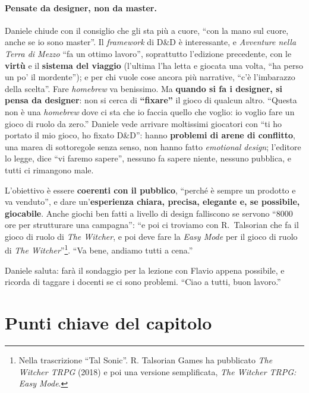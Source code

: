 \paragraph{Pensate da designer, non da master.} Daniele chiude con il consiglio che gli sta più a cuore,
``con la mano sul cuore, anche se io sono master''. Il \emph{framework} di D\&D è interessante, e
\emph{Avventure nella Terra di Mezzo} ``fa un ottimo lavoro'', soprattutto l'edizione precedente, con le
\textbf{virtù} e il \textbf{sistema del viaggio} (l'ultima l'ha letta e giocata una volta, ``ha perso un
po' il mordente''); e per chi vuole cose ancora più narrative, ``c'è l'imbarazzo della scelta''. Fare
\emph{homebrew} va benissimo. Ma \textbf{quando si fa i designer, si pensa da designer}: non si cerca di
\textbf{``fixare''} il gioco di qualcun altro. ``Questa non è una \emph{homebrew} dove ci sta che io
faccia quello che voglio: io voglio fare un gioco di ruolo da zero.'' Daniele vede arrivare moltissimi
giocatori con ``ti ho portato il mio gioco, ho fixato D\&D'': hanno \textbf{problemi di arene di
conflitto}, una marea di sottoregole senza senso, non hanno fatto \emph{emotional design}; l'editore lo
legge, dice ``vi faremo sapere'', nessuno fa sapere niente, nessuno pubblica, e tutti ci rimangono male.

L'obiettivo è essere \textbf{coerenti con il pubblico}, ``perché è sempre un prodotto e va venduto'', e
dare un'\textbf{esperienza chiara, precisa, elegante e, se possibile, giocabile}. Anche giochi ben fatti
a livello di design falliscono se servono ``8000 ore per strutturare una campagna'': ``e poi ci troviamo
con R.~Talsorian che fa il gioco di ruolo di \emph{The Witcher}, e poi deve fare la \emph{Easy Mode} per
il gioco di ruolo di \emph{The Witcher}''\footnote{Nella trascrizione ``Tal Sonic''. R. Talsorian Games
ha pubblicato \emph{The Witcher TRPG} (2018) e poi una versione semplificata, \emph{The Witcher TRPG:
Easy Mode}.}. ``Va bene, andiamo tutti a cena.''

Daniele saluta: farà il sondaggio per la lezione con Flavio appena possibile, e ricorda di taggare i
docenti se ci sono problemi. ``Ciao a tutti, buon lavoro.''

\section*{Punti chiave del capitolo}

